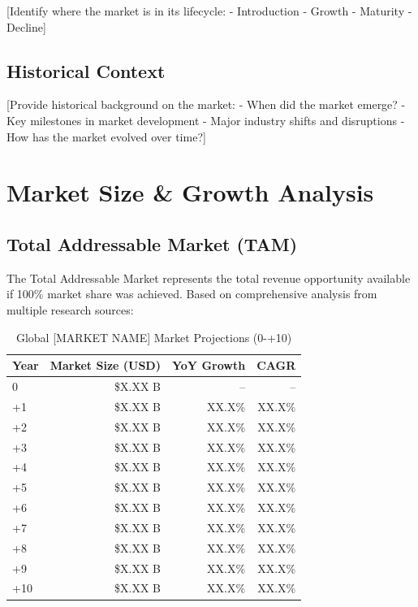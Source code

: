 \documentclass[11pt,letterpaper]{report}
\newcommand{\reporttitle}{[MARKET NAME]}
\newcommand{\baseyear}{0}
\newcommand{\horizonyear}{\the\numexpr\baseyear+10\relax}    %
\newcommand{\yr}[1]{\the\numexpr\baseyear+#1\relax}       %
\begin{document}
[Identify where the market is in its lifecycle:
- Introduction
- Growth
- Maturity
- Decline]

\section{Historical Context}

[Provide historical background on the market:
- When did the market emerge?
- Key milestones in market development
- Major industry shifts and disruptions
- How has the market evolved over time?]

\chapter{Market Size \& Growth Analysis}

\section{Total Addressable Market (TAM)}

The Total Addressable Market represents the total revenue opportunity available if 100\% market share was achieved. Based on comprehensive analysis from multiple research sources:


\begin{table}[htbp]
\centering
\caption{Global \reporttitle{} Market Projections (\baseyear{}-\horizonyear{})}
\begin{tabular}{@{}lrrr@{}}
\toprule
\textbf{Year} & \textbf{Market Size (USD)} & \textbf{YoY Growth} & \textbf{CAGR} \\
\midrule
\baseyear{} & \$X.XX B & -- & -- \\
\rowcolor{tablealt} \yr{1} & \$X.XX B & XX.X\% & XX.X\% \\
\yr{2} & \$X.XX B & XX.X\% & XX.X\% \\
\rowcolor{tablealt} \yr{3} & \$X.XX B & XX.X\% & XX.X\% \\
\yr{4} & \$X.XX B & XX.X\% & XX.X\% \\
\rowcolor{tablealt} \yr{5} & \$X.XX B & XX.X\% & XX.X\% \\
\yr{6} & \$X.XX B & XX.X\% & XX.X\% \\
\rowcolor{tablealt} \yr{7} & \$X.XX B & XX.X\% & XX.X\% \\
\yr{8} & \$X.XX B & XX.X\% & XX.X\% \\
\rowcolor{tablealt} \yr{9} & \$X.XX B & XX.X\% & XX.X\% \\
\horizonyear{} & \$X.XX B & XX.X\% & XX.X\% \\
\bottomrule
\end{tabular}
\label{tab:tam_projections}
\end{table}
\end{document}
